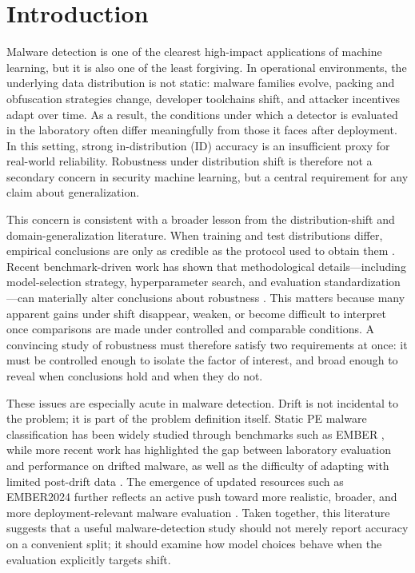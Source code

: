 \documentclass[pdflatex,sn-mathphys-num]{sn-jnl}%
\theoremstyle{thmstyleone}%
\theoremstyle{thmstyletwo}%
\theoremstyle{thmstylethree}%
\begin{document}
\section{Introduction}
\label{sec:introduction}

Malware detection is one of the clearest high-impact applications of machine learning, but it is also one of the least forgiving. In operational environments, the underlying data distribution is not static: malware families evolve, packing and obfuscation strategies change, developer toolchains shift, and attacker incentives adapt over time. As a result, the conditions under which a detector is evaluated in the laboratory often differ meaningfully from those it faces after deployment. In this setting, strong in-distribution (ID) accuracy is an insufficient proxy for real-world reliability. Robustness under distribution shift is therefore not a secondary concern in security machine learning, but a central requirement for any claim about generalization.

This concern is consistent with a broader lesson from the distribution-shift and domain-generalization literature. When training and test distributions differ, empirical conclusions are only as credible as the protocol used to obtain them \cite{quinonero-candela2008datasetshift,zhou2023dgsurvey}. Recent benchmark-driven work has shown that methodological details---including model-selection strategy, hyperparameter search, and evaluation standardization---can materially alter conclusions about robustness \cite{gulrajani2021domainbed,koh2021wilds,yao2022wildtime}. This matters because many apparent gains under shift disappear, weaken, or become difficult to interpret once comparisons are made under controlled and comparable conditions. A convincing study of robustness must therefore satisfy two requirements at once: it must be controlled enough to isolate the factor of interest, and broad enough to reveal when conclusions hold and when they do not.

These issues are especially acute in malware detection. Drift is not incidental to the problem; it is part of the problem definition itself. Static PE malware classification has been widely studied through benchmarks such as EMBER \cite{anderson2018ember}, while more recent work has highlighted the gap between laboratory evaluation and performance on drifted malware, as well as the difficulty of adapting with limited post-drift data \cite{barbero2022transcending,li2025revisitingdrift}. The emergence of updated resources such as EMBER2024 further reflects an active push toward more realistic, broader, and more deployment-relevant malware evaluation \cite{joyce2025ember2024}. Taken together, this literature suggests that a useful malware-detection study should not merely report accuracy on a convenient split; it should examine how model choices behave when the evaluation explicitly targets shift.
\end{document}
